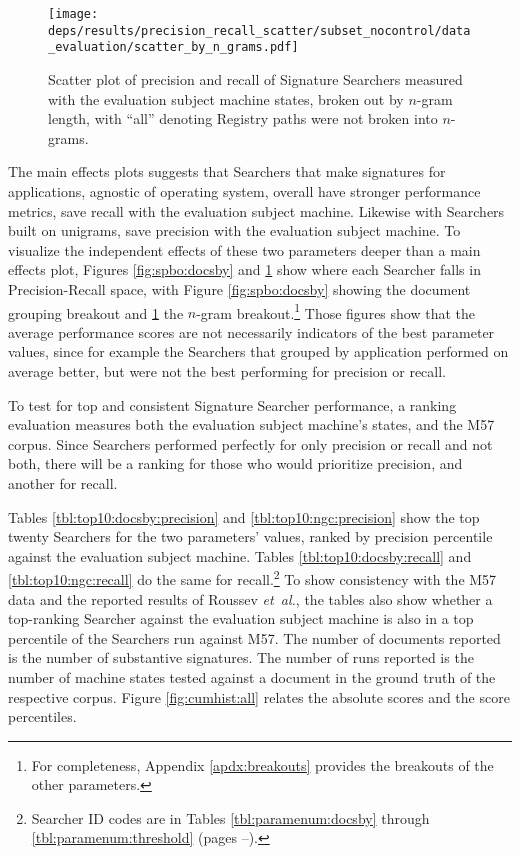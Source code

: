 \documentclass[11pt]{ucthesis}
\theoremstyle{plain}
\theoremstyle{definition}
\newcommand{\etal}{\emph{et~al.}\xspace}
\begin{document}
\begin{figure}
  \centering
  \texttt{[image: deps/results/precision\_recall\_scatter/subset\_nocontrol/data\_evaluation/scatter\_by\_n\_grams.pdf]}
  \caption{Scatter plot of precision and recall of Signature Searchers measured with the evaluation subject machine states, broken out by $n$-gram length, with ``all'' denoting Registry paths were not broken into $n$-grams.}
  \label{fig:spbo:ngram}
\end{figure}

The main effects plots suggests that Searchers that make signatures for applications, agnostic of operating system, overall have stronger performance metrics, save recall with the evaluation subject machine.  Likewise with Searchers built on unigrams, save precision with the evaluation subject machine.  To visualize the independent effects of these two parameters deeper than a main effects plot, Figures \ref{fig:spbo:docsby} and \ref{fig:spbo:ngram} show where each Searcher falls in Precision-Recall space, with Figure \ref{fig:spbo:docsby} showing the document grouping breakout and \ref{fig:spbo:ngram} the $n$-gram breakout.\footnote{For completeness, Appendix \ref{apdx:breakouts} provides the breakouts of the other parameters.}  Those figures show that the average performance scores are not necessarily indicators of the best parameter values, since for example the Searchers that grouped by application performed on average better, but were not the best performing for precision or recall.

To test for top and consistent Signature Searcher performance, a ranking evaluation measures both the evaluation subject machine's states, and the M57 corpus.  Since Searchers performed perfectly for only precision or recall and not both, there will be a ranking for those who would prioritize precision, and another for recall.

Tables \ref{tbl:top10:docsby:precision} and \ref{tbl:top10:ngc:precision} show the top twenty Searchers for the two parameters' values, ranked by precision percentile against the evaluation subject machine.  Tables \ref{tbl:top10:docsby:recall} and \ref{tbl:top10:ngc:recall} do the same for recall.\footnote{Searcher ID codes are in Tables \ref{tbl:paramenum:docsby} through \ref{tbl:paramenum:threshold} (pages \pageref{tbl:paramenum:docsby}--\pageref{tbl:paramenum:threshold}).}  To show consistency with the M57 data and the reported results of Roussev \etal, the tables also show whether a top-ranking Searcher against the evaluation subject machine is also in a top percentile of the Searchers run against M57.  The number of documents reported is the number of substantive signatures.  The number of runs reported is the number of machine states tested against a document in the ground truth of the respective corpus.  Figure \ref{fig:cumhist:all} relates the absolute scores and the score percentiles.
\end{document}
